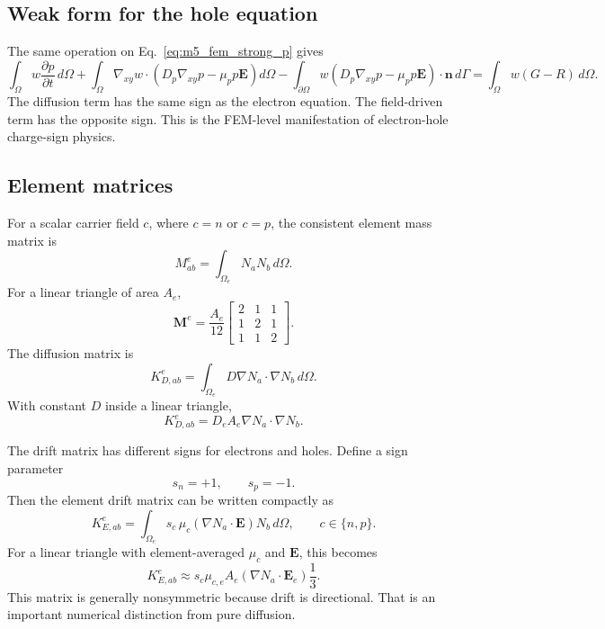 \documentclass[11pt]{article}
\begin{document}
\subsection{Weak form for the hole equation}

The same operation on Eq.~\eqref{eq:m5_fem_strong_p} gives
\begin{equation}
    \int_\Omega w\frac{\partial p}{\partial t}\,d\Omega
    +\int_\Omega \nabla_{xy}w\cdot\left(D_p\nabla_{xy}p-\mu_p p\mathbf{E}\right)d\Omega
    -\int_{\partial\Omega}w\left(D_p\nabla_{xy}p-\mu_p p\mathbf{E}\right)\cdot\mathbf{n}\,d\Gamma
    =\int_\Omega w(G-R)\,d\Omega.
    \label{eq:m5_weak_p}
\end{equation}
The diffusion term has the same sign as the electron equation. The field-driven term has the opposite sign. This is the FEM-level manifestation of electron-hole charge-sign physics.

\subsection{Element matrices}

For a scalar carrier field \(c\), where \(c=n\) or \(c=p\), the consistent element mass matrix is
\begin{equation}
    M^e_{ab}=\int_{\Omega_e}N_aN_b\,d\Omega.
\end{equation}
For a linear triangle of area \(A_e\),
\begin{equation}
    \mathbf{M}^e=\frac{A_e}{12}
    \begin{bmatrix}
    2&1&1\\
    1&2&1\\
    1&1&2
    \end{bmatrix}.
\end{equation}
The diffusion matrix is
\begin{equation}
    K^e_{D,ab}=\int_{\Omega_e}D\nabla N_a\cdot\nabla N_b\,d\Omega.
\end{equation}
With constant \(D\) inside a linear triangle,
\begin{equation}
    K^e_{D,ab}=D_e A_e\nabla N_a\cdot\nabla N_b.
\end{equation}

The drift matrix has different signs for electrons and holes. Define a sign parameter
\begin{equation}
    s_n=+1,\qquad s_p=-1.
\end{equation}
Then the element drift matrix can be written compactly as
\begin{equation}
    K^e_{E,ab}=\int_{\Omega_e}s_c\,\mu_c\left(\nabla N_a\cdot\mathbf{E}\right)N_b\,d\Omega,
    \qquad c\in\{n,p\}.
    \label{eq:m5_element_drift}
\end{equation}
For a linear triangle with element-averaged \(\mu_c\) and \(\mathbf{E}\), this becomes
\begin{equation}
    K^e_{E,ab}\approx s_c\mu_{c,e}A_e\left(\nabla N_a\cdot\mathbf{E}_e\right)\frac{1}{3}.
\end{equation}
This matrix is generally nonsymmetric because drift is directional. That is an important numerical distinction from pure diffusion.
\end{document}

